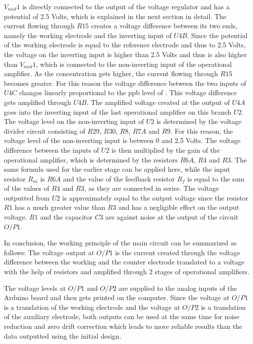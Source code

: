 $V_{mid}1$ is directly connected to the output of the voltage regulator and has a potential of 2.5 Volts, which is explained in the next section in detail. The current flowing through $R15$ creates a voltage difference between its two ends, namely the working electrode and the inverting input of $U4B$. Since the potential of the working electrode is equal to the reference electrode and thus to 2.5 Volts, the voltage on the inverting input is higher than 2.5 Volts and thus is also higher than $V_{mid}1$, which is connected to the non-inverting input of the operational amplifier. As the  concentration gets higher, the current flowing through $R15$ becomes greater. For this reason the voltage difference between the two inputs of $U4C$ changes linearly proportional to the ppb level of . This voltage difference gets amplified through $U4B$. The amplified voltage created at the output of $U4A$ goes into the inverting input of the last operational amplifier on this branch $U2$. The voltage level on the non-inverting input of $U2$ is determined by the voltage divider circuit consisting of $R29$, $R30$, $R8$, $R7A$ and $R9$. For this reason, the voltage level of the non-inverting input is between 0 and 2.5 Volts. The voltage difference between the inputs of $U2$ is then multiplied by the gain of the operational amplifier, which is determined by the resistors $R6A$, $R4$ and $R3$. The same formula used for the earlier stage can be applied here, while the input resistor $R_{in}$ is $R6A$ and the value of the feedback resistor $R_f$ is equal to the sum of the values of $R4$ and $R3$, as they are connected in series. The voltage outputted from $U2$ is approximately equal to the output voltage since the resistor $R1$ has a much greater value than $R3$ and has a negligible effect on the output voltage. $R1$ and the capacitor $C3$ are against noise at the output of the circuit $O/P1$.\par 
In conclusion, the working principle of the main circuit can be summarized as follows: The voltage output at $O/P1$ is the current created through the voltage difference between the working and the counter electrode translated to a voltage with the help of resistors and amplified through 2 stages of operational amplifiers.\par 
The voltage levels at $O/P1$ and $O/P2$ are supplied to the analog inputs of the Arduino board and then gets printed on the computer. Since the voltage at $O/P1$ is a translation of the working electrode and the voltage at $O/P2$ is a translation of the auxiliary electrode, both outputs can be used at the same time for noise reduction and zero drift correction which leads to more reliable results than the data outputted using the initial design.


